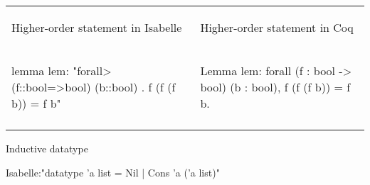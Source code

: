 \documentclass[article]{aaltoseries}
\begin{document}
\begin{tabular}{p{.45\linewidth} p{.45\linewidth}}
\begin{center}Higher-order statement in Isabelle\end{center}  &  \begin{center}Higher-order statement in Coq\end{center} \\
\begin{isabelle}
lemma lem:
"\<forall> (f::bool=>bool) (b::bool) .
    f (f (f b)) = f b"
\end{isabelle}
&
\begin{coq}
Lemma lem: 
forall (f : bool -> bool) (b : bool),
    f (f (f b)) = f b.
\end{coq}
\\ \arrayrulecolor{gray}\hline
\end{tabular}

Inductive datatype

Isabelle:"datatype ’a list = Nil | Cons ’a (’a list)" %
\end{document}
